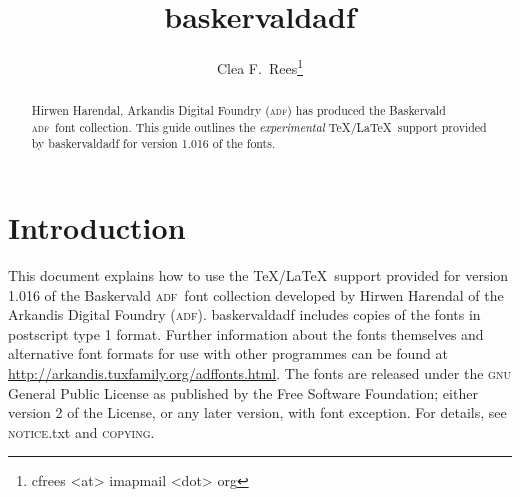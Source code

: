 \documentclass[11pt,british]{article}
\title{baskervaldadf}
\author{Clea F.\ Rees\footnote{cfrees <at> imapmail <dot> org}}
\date{\dyddiad}
\begin{document}
\maketitle\thispagestyle{empty}
\setlength{\parindent}{0pt}
\setlength{\parskip}{0.5em}
	
	
\newcommand*{\adf}{\textsc{adf}}
\newcommand*{\lpack}[1]{\textsf{#1}}
\newcommand*{\fgroup}[1]{\textsf{#1}}
\newcommand*{\fname}[1]{\textsf{#1}}

\begin{abstract}
	\hspace*{-\parindent}Hirwen Harendal, Arkandis Digital Foundry (\adf) has produced the Baskervald \adf\ font collection. This guide outlines the \emph{experimental} \TeX/\LaTeX\ support provided by \lpack{baskervaldadf} for version 1.016 of the fonts.
\end{abstract}

\tableofcontents

\section{Introduction}

This document explains how to use the \TeX/\LaTeX\ support provided for version 1.016 of the Baskervald \adf\ font collection developed by Hirwen Harendal of the Arkandis Digital Foundry (\adf). \lpack{baskervaldadf} includes copies of the fonts in postscript type 1 format. Further  information about the fonts themselves and alternative font formats for use with other programmes can be found at \url{http://arkandis.tuxfamily.org/adffonts.html}. The fonts are released under the \textsc{gnu} General Public License as published by the Free Software Foundation; either version 2 of the License, or any later version, with font exception. For details, see \textsc{notice}.txt and \textsc{copying}.
\end{document}
